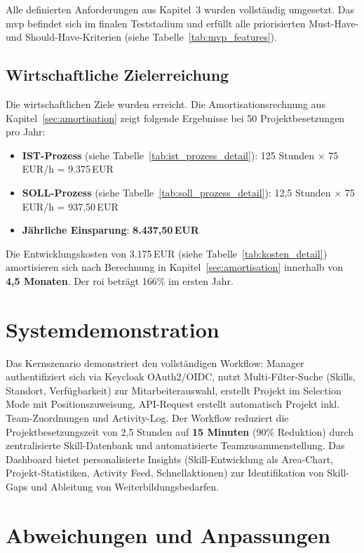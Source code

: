 Alle definierten Anforderungen aus Kapitel~3 wurden vollständig umgesetzt. Das \gls{mvp} befindet sich im finalen Teststadium und erfüllt alle priorisierten Must-Have- und Should-Have-Kriterien (siehe Tabelle~\ref{tab:mvp_features}).

\subsection{Wirtschaftliche Zielerreichung}

Die wirtschaftlichen Ziele wurden erreicht. Die Amortisationsrechnung aus Kapitel~\ref{sec:amortisation} zeigt folgende Ergebnisse bei 50 Projektbesetzungen pro Jahr:

\begin{itemize}[noitemsep]
    \item \textbf{IST-Prozess} (siehe Tabelle~\ref{tab:ist_prozess_detail}): 125 Stunden × 75\,EUR/h = 9.375\,EUR
    \item \textbf{SOLL-Prozess} (siehe Tabelle~\ref{tab:soll_prozess_detail}): 12,5 Stunden × 75\,EUR/h = 937,50\,EUR
    \item \textbf{Jährliche Einsparung}: \textbf{8.437,50\,EUR}
\end{itemize}

Die Entwicklungskosten von 3.175\,EUR (siehe Tabelle~\ref{tab:kosten_detail}) amortisieren sich nach Berechnung in Kapitel~\ref{sec:amortisation} innerhalb von \textbf{4,5 Monaten}. Der \gls{roi} beträgt 166\% im ersten Jahr.

\section{Systemdemonstration}

Das Kernszenario demonstriert den vollständigen Workflow: Manager authentifiziert sich via Keycloak OAuth2/OIDC, nutzt Multi-Filter-Suche (Skills, Standort, Verfügbarkeit) zur Mitarbeiterauswahl, erstellt Projekt im Selection Mode mit Positionszuweisung, API-Request erstellt automatisch Projekt inkl. Team-Zuordnungen und Activity-Log. Der Workflow reduziert die Projektbesetzungszeit von 2,5 Stunden auf \textbf{15 Minuten} (90\% Reduktion) durch zentralisierte Skill-Datenbank und automatisierte Teamzusammenstellung. Das Dashboard bietet personalisierte Insights (Skill-Entwicklung als Area-Chart, Projekt-Statistiken, Activity Feed, Schnellaktionen) zur Identifikation von Skill-Gaps und Ableitung von Weiterbildungsbedarfen.

\section{Abweichungen und Anpassungen}

